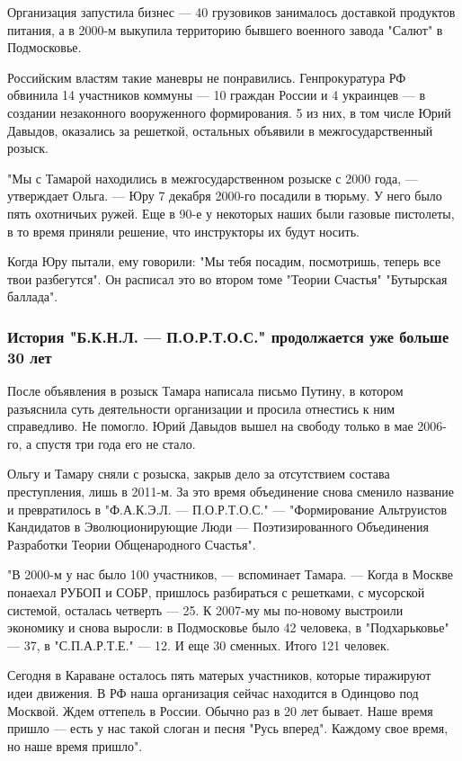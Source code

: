 \documentclass[a4paper,11pt]{extreport}
\begin{document}
Организация запустила бизнес --- 40 грузовиков занималось доставкой продуктов
питания, а в 2000-м выкупила территорию бывшего военного завода "Салют" в
Подмосковье.

Российским властям такие маневры не понравились. Генпрокуратура РФ обвинила 14
участников коммуны --- 10 граждан России и 4 украинцев --- в создании незаконного
вооруженного формирования. 5 из них, в том числе Юрий Давыдов, оказались за
решеткой, остальных объявили в межгосударственный розыск.

"Мы с Тамарой находились в межгосударственном розыске с 2000 года, --- утверждает
Ольга. --- Юру 7 декабря 2000-го посадили в тюрьму. У него было пять охотничьих
ружей. Еще в 90-е у некоторых наших были газовые пистолеты, в то время приняли
решение, что инструкторы их будут носить.

Когда Юру пытали, ему говорили: "Мы тебя посадим, посмотришь, теперь все твои
разбегутся". Он расписал это во втором томе "Теории Счастья" "Бутырская
баллада".

\subsubsection{История "Б.К.Н.Л. --- П.О.Р.Т.О.С." продолжается уже больше 30 лет}

После объявления в розыск Тамара написала письмо Путину, в котором разъяснила
суть деятельности организации и просила отнестись к ним справедливо. Не
помогло. Юрий Давыдов вышел на свободу только в мае 2006-го, а спустя три года
его не стало. 

Ольгу и Тамару сняли с розыска, закрыв дело за отсутствием состава
преступления, лишь в 2011-м. За это время объединение снова сменило название и
превратилось в "Ф.А.К.Э.Л. --- П.О.Р.Т.О.С." --- "Формирование Альтруистов
Кандидатов в Эволюционирующие Люди --- Поэтизированного Объединения Разработки
Теории Общенародного Счастья".

"В 2000-м у нас было 100 участников, --- вспоминает Тамара. --- Когда в Москве
понаехал РУБОП и СОБР, пришлось разбираться с решетками, с мусорской системой,
осталась четверть --- 25. К 2007-му мы по-новому выстроили экономику и снова
выросли: в Подмосковье было 42 человека, в "Подхарьковье" --- 37, в
"С.П.А.Р.Т.Е." --- 12. И еще 30 сменных. Итого 121 человек. 

Сегодня в Караване осталось пять матерых участников, которые тиражируют идеи
движения. В РФ наша организация сейчас находится в Одинцово под Москвой. Ждем
оттепель в России. Обычно раз в 20 лет бывает. Наше время пришло --- есть у нас
такой слоган и песня "Русь вперед". Каждому свое время, но наше время пришло".
\end{document}
